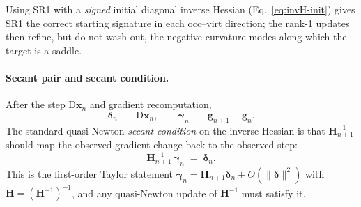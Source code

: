 \documentclass[11pt,a4paper]{article}
\newcommand{\xx}{\mathbf{x}}
\newcommand{\gg}{\mathbf{g}}
\newcommand{\HH}{\mathbf{H}}
\begin{document}
Using SR1 with a \emph{signed} initial diagonal inverse Hessian
(Eq.~\eqref{eq:invH-init}) gives SR1 the correct starting signature
in each occ--virt direction; the rank-1 updates then refine, but do
not wash out, the negative-curvature modes along which the target is
a saddle.

\paragraph{Secant pair and secant condition.}
After the step $\mathrm{D}\xx_n$ and gradient recomputation,
\begin{equation}
\bm{\delta}_n \;\equiv\; \mathrm{D}\xx_n, \qquad
\bm{\gamma}_n \;\equiv\; \gg_{n+1} - \gg_n.
\end{equation}
The standard quasi-Newton \emph{secant condition} on the inverse
Hessian is that $\HH^{-1}_{n+1}$ should map the observed gradient
change back to the observed step:
\begin{equation}
\HH^{-1}_{n+1}\,\bm{\gamma}_n \;=\; \bm{\delta}_n.
\label{eq:secant}
\end{equation}
This is the first-order Taylor statement
$\bm{\gamma}_n = \HH_{n+1}\bm{\delta}_n+O(\|\bm\delta\|^2)$ with $\HH = (\HH^{-1})^{-1}$, and any quasi-Newton update of $\HH^{-1}$
must satisfy it.
\end{document}
